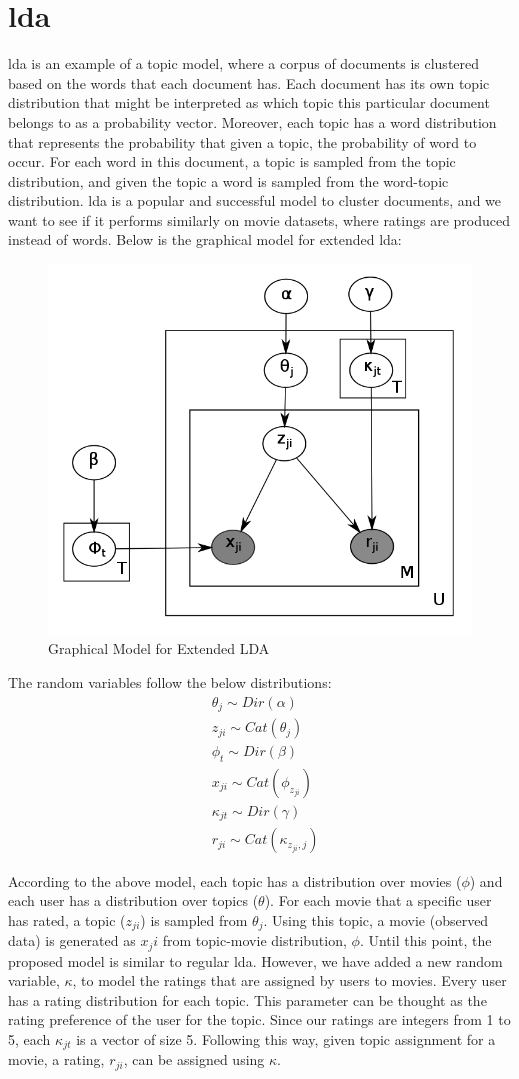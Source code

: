 \documentclass{article} %
\begin{document}
\section{\acrlong{lda}}
\gls{lda} \cite{lda} is an example of a topic model, where a corpus of documents is 
clustered based on the words that each document has. Each document has its own 
topic distribution that might be interpreted as which topic this particular 
document belongs to as a probability vector. Moreover, each topic has a word 
distribution that represents the probability that given a topic, the probability 
of word to occur. For each word in this document, a topic is sampled from the topic 
distribution, and given the topic a word is sampled from the word-topic 
distribution. \gls{lda} is a popular and successful model to cluster documents, 
and we want to see if it performs similarly on movie datasets, where ratings 
are produced instead of words. Below is the graphical model for extended 
\gls{lda}: 
\begin{figure}[h]
  \begin{center}
    \includegraphics[width=.4\textwidth]{E-LDA.png}
    \caption{Graphical Model for Extended LDA}
    \label{fig:plot1}
  \end{center}
\end{figure}

The random variables follow the below distributions:
\begin{align*}
  &\theta_j \sim Dir(\alpha)\\
  &z_{ji} \sim Cat(\theta_j)\\
  &\phi_t \sim Dir(\beta)\\
  &x_{ji} \sim Cat(\phi_{z_{ji}}) \\
  &\kappa_{jt} \sim Dir(\gamma)\\
  &r_{ji} \sim Cat(\kappa_{z_{ji},j})
\end{align*}

According to the above model, each topic has a distribution over movies ($\phi$) 
and each user has a distribution over topics ($\theta$). For each movie that a 
specific user has rated, a topic ($z_{ji}$) is sampled from $\theta_j$. Using 
this topic, a movie (observed data) is generated as $x_ji$ from topic-movie 
distribution, $\phi$. Until this point, the proposed model is similar to regular 
\gls{lda}. However, we have added a new random variable, $\kappa$, to model the 
ratings that are assigned by users to movies. Every user has a rating 
distribution for each topic. This parameter can be thought as the rating 
preference of the user for the topic. Since our ratings are integers from 1 to 
5, each $\kappa_{jt}$ is a vector of size 5. Following this way, given topic 
assignment for a movie, a rating, $r_{ji}$, can be assigned using $\kappa$. 
\end{document}
